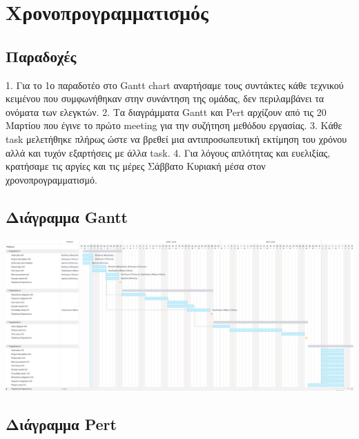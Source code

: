 \documentclass{article}
\begin{document}
\coverpages


\section{Χρονοπρογραμματισμός}
\vspace{20px}
\subsection{Παραδοχές} 
1.	Για το 1ο παραδοτέο στο Gantt chart αναρτήσαμε τους συντάκτες κάθε τεχνικού κειμένου που συμφωνήθηκαν στην συνάντηση της ομάδας, δεν περιλαμβάνει τα ονόματα των ελεγκτών.
2.	Τα διαγράμματα Gantt και Pert αρχίζουν από τις 20 Μαρτίου που έγινε το πρώτο meeting για την συζήτηση μεθόδου εργασίας.
3.	Κάθε task μελετήθηκε πλήρως ώστε να βρεθεί μια αντιπροσωπευτική εκτίμηση του χρόνου αλλά και τυχόν εξαρτήσεις με άλλα task.
4.	Για λόγους απλότητας και ευελιξίας, κρατήσαμε τις αργίες και τις μέρες Σάββατο Κυριακή μέσα στον χρονοπρογραμματισμό.
\vspace{20px}
\subsection{Διάγραμμα Gantt} 
\begin{center}
    \includegraphics[scale=0.4]{gantteam.png}
\end{center}


\subsection{Διάγραμμα Pert} 
\end{document}
